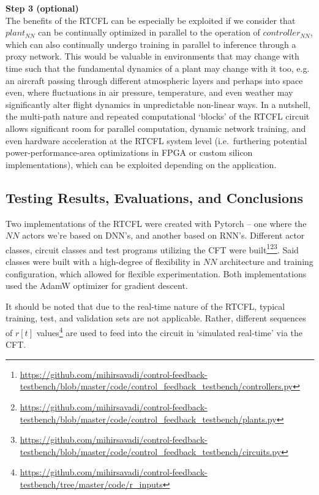 \documentclass[10pt,twocolumn,letterpaper]{article}
\begin{document}
            \textbf{Step 3 (optional)}\\
            The benefits of the RTCFL can be especially be exploited if we consider that $plant_{NN}$ can be continually
            optimized in parallel to the operation of $controller_{NN}$, which can also continually undergo training in
            parallel to inference through a proxy network. This would be valuable in environments that may change with
            time such that the fundamental dynamics of a plant may change with it too, e.g. an aircraft passing through
            different atmospheric layers and perhaps into space even, where fluctuations in air pressure, temperature,
            and even weather may significantly alter flight dynamics in unpredictable non-linear ways. In a nutshell,
            the multi-path nature and repeated computational `blocks' of the RTCFL circuit allows significant room for
            parallel computation, dynamic network training, and even hardware acceleration at the RTCFL system level
            (i.e.\ furthering potential power-performance-area optimizations in FPGA or custom silicon implementations),
            which can be exploited depending on the application.


        \subsection{Testing Results, Evaluations, and Conclusions} \label{RTCFLtesting}

            Two implementations of the RTCFL were created with Pytorch -- one where the $NN$ actors we're based on
            DNN's, and another based on RNN's. Different actor classes, circuit classes and test programs utilizing the
            CFT were
            built\footnote{\url{https://github.com/mihirsavadi/control-feedback-testbench/blob/master/code/control_feedback_testbench/controllers.py}}\footnote{\url{https://github.com/mihirsavadi/control-feedback-testbench/blob/master/code/control_feedback_testbench/plants.py}}\footnote{\url{https://github.com/mihirsavadi/control-feedback-testbench/blob/master/code/control_feedback_testbench/circuits.py}}.
            Said classes were built with a high-degree of flexibility in $NN$ architecture and training configuration,
            which allowed for flexible experimentation. Both implementations used the AdamW optimizer for gradient
            descent.

            It should be noted that due to the real-time nature of the RTCFL, typical training, test, and validation
            sets are not applicable. Rather, different sequences of $r[t]$
            values\footnote{\url{https://github.com/mihirsavadi/control-feedback-testbench/tree/master/code/r_inputs}}
            are used to feed into the circuit in `simulated real-time' via the CFT.
\end{document}
